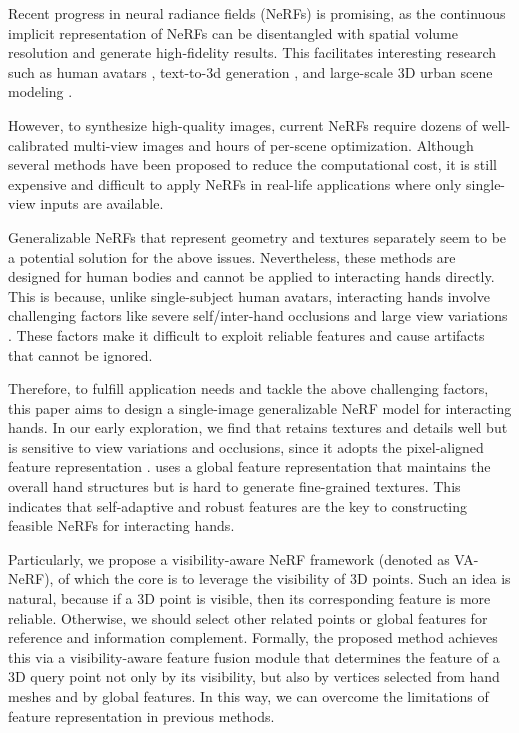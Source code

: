 \documentclass[letterpaper]{article}
\begin{document}
Recent progress in neural radiance fields (NeRFs) \cite{mildenhall2021nerf,gao2022nerf,niemeyer2022regnerf, Johari_2022_CVPR} is promising, as the continuous implicit representation of NeRFs can be disentangled with spatial volume resolution and generate high-fidelity results. This facilitates interesting research such as human avatars \cite{jiang2022instantavatar}, text-to-3d generation \cite{poole2022dreamfusion}, and large-scale 3D urban scene modeling \cite{turki2022mega}.

However, to synthesize high-quality images, current NeRFs require dozens of well-calibrated multi-view images and hours of per-scene optimization. Although several methods \cite{muller2022instant,chen2022tensorf} have been proposed to reduce the computational cost, it is still expensive and difficult to apply NeRFs in real-life applications where only single-view inputs are available.

Generalizable NeRFs \cite{mihajlovic2022keypointnerf,kwon2021neural} that represent geometry and textures separately seem to be a potential solution for the above issues. Nevertheless, these methods are designed for human bodies and cannot be applied to interacting hands directly. This is because, unlike single-subject human avatars, interacting hands involve challenging factors like severe self/inter-hand occlusions and large view variations \cite{park2022handoccnet,deng2022recurrent}. These factors make it difficult to exploit reliable features and cause artifacts that cannot be ignored.

Therefore, to fulfill application needs and tackle the above challenging factors, this paper aims to design a single-image generalizable NeRF model for interacting hands. In our early exploration, we find that \cite{mihajlovic2022keypointnerf} retains textures and details well but is sensitive to view variations and occlusions, since it adopts the pixel-aligned feature representation \cite{saito2019pifu}. \cite{kwon2021neural} uses a global feature representation that maintains the overall hand structures but is hard to generate fine-grained textures. This indicates that self-adaptive and robust features are the key to constructing feasible NeRFs for interacting hands.

Particularly, we propose a visibility-aware NeRF framework (denoted as VA-NeRF), of which the core is to leverage the visibility of 3D points. Such an idea is natural, because if a 3D point is visible, then its corresponding feature is more reliable. Otherwise, we should select other related points or global features for reference and information complement. Formally, the proposed method achieves this via a visibility-aware feature fusion module that determines the feature of a 3D query point not only by its visibility, but also by vertices selected from hand meshes and by global features. In this way, we can overcome the limitations of feature representation in previous methods.
\end{document}
